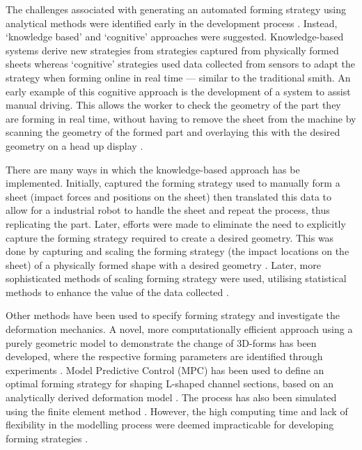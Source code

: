 The challenges associated with generating an automated forming strategy using analytical methods were identified early in the development process \citep{Golle2007DrivingProducts}. Instead, `knowledge based' and `cognitive' approaches were suggested. Knowledge-based systems derive new strategies from strategies captured from physically formed sheets whereas `cognitive' strategies used data collected from sensors to adapt the strategy when forming online in real time --- similar to the traditional smith. An early example of this cognitive approach is the development of a system to assist manual driving. This allows the worker to check the geometry of the part they are forming in real time, without having to remove the sheet from the machine by scanning the geometry of the formed part and overlaying this with the desired geometry on a head up display \citep{Scherer2010DrivingProducts}.

There are many ways in which the knowledge-based approach has be implemented. Initially, \cite{Hoffman2009AnHandling} captured the forming strategy used to manually form a sheet (impact forces and positions on the sheet) then translated this data to allow for a industrial robot to handle the sheet and repeat the process, thus replicating the part. %
Later, efforts were made to eliminate the need to explicitly capture the forming strategy required to create a desired geometry. This was done by capturing and scaling the forming strategy (the impact locations on the sheet) of a physically formed shape with a desired geometry \citep{Opritescu2012AutomatedStrategy}. Later, more sophisticated methods of scaling forming strategy were used, utilising statistical methods to enhance the value of the data collected \citep{Opritescu2016VariationVariance,Hartmann2019Knowledge-basedPartitioning}.

Other methods have been used to specify forming strategy and investigate the deformation mechanics. A novel, more computationally efficient approach using a purely geometric model to demonstrate the change of 3D-forms has been developed, where the respective forming parameters are identified through experiments \citep{Yang2011GeometricalProcess}. Model Predictive Control (MPC) has been used to define an optimal forming strategy for shaping L-shaped channel sections, based on an analytically derived deformation model \citep{Yang2009AutomatisierungProgramming}. The process has also been simulated using the finite element method \citep{Hoffmann2005StudiesMetal}. However, the high computing time and lack of flexibility in the modelling process were deemed impracticable for developing forming strategies \citep{Scherer2013MethodenBlechumformung}. 

